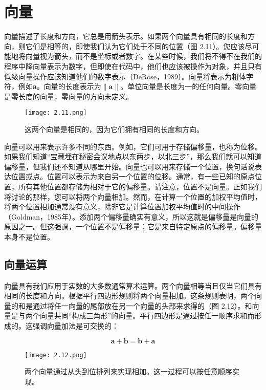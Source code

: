 \documentclass[lang=cn,12pt]{elegantbook}
\begin{document}
\section{向量}
向量描述了长度和方向，它总是用箭头表示。如果两个向量具有相同的长度和方向，则它们是相等的，即使我们认为它们处于不同的位置（图 2.11）。您应该尽可能地将向量视为箭头，而不是坐标或者数字。在某些时候，我们将不得不在我们的程序中降向量表示为数字，但即使在代码中，他们也应该被操作为对象，并且只有低级向量操作应该知道他们的数字表示（DeRose，1989）。向量将表示为粗体字符，例如\textbf{a}。向量的长度表示为$\|\mathbf{a}\|$。单位向量是长度为一的任何向量。零向量是零长度的向量，零向量的方向未定义。

\begin{figure}[htbp]
  \centering
  \texttt{[image: 2.11.png]}
  \caption{这两个向量是相同的，因为它们拥有相同的长度和方向。}
\end{figure}

向量可以用来表示许多不同的东西。例如，它们可用于存储偏移量，也称为位移。如果我们知道“宝藏埋在秘密会议地点以东两步，以北三步”，那么我们就可以知道偏移量，但我们还不知道从哪里开始。向量也可以用来存储一个位置，换句话说表达位置或点。位置可以表示为来自另一个位置的位移。通常，有一些已知的原点位置，所有其他位置都存储为相对于它的偏移量。请注意，位置不是向量。正如我们将讨论的那样，您可以将两个向量相加。然而，在计算一个位置的加权平均值时，将两个位置相加通常没有意义，除非它是计算位置加权平均值时的中间操作（Goldman，1985年）。添加两个偏移量确实有意义，所以这就是偏移量是向量的原因之一。但这强调，一个位置不是偏移量；它是来自特定原点的偏移量。偏移量本身不是位置。

\subsection{向量运算}

向量具有我们应用于实数的大多数通常算术运算。两个向量相等当且仅当它们具有相同的长度和方向。根据平行四边形规则将两个向量相加。这条规则表明，两个向量的和是通过将任一向量的尾部放在另一个向量的头部来求得的（图 2.12）。和向量是与两个向量共同“构成三角形”的向量。平行四边形是通过按任一顺序求和而形成的。这强调向量加法是可交换的：

$$
  \mathbf{a}+\mathbf{b}=\mathbf{b}+\mathbf{a}
$$

\begin{figure}[htbp]
  \centering
  \texttt{[image: 2.12.png]}
  \caption{两个向量通过从头到位排列来实现相加。这一过程可以按任意顺序实现。}
\end{figure}
\end{document}
